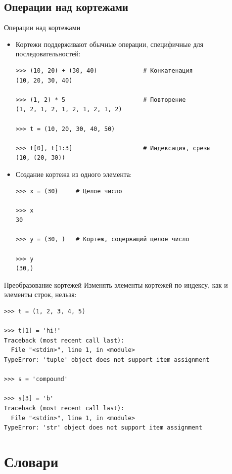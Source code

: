 \documentclass[aspectratio=169, mathserif]{beamer}%
\begin{document}
\subsection{Операции над кортежами}

\begin{frame}[fragile]{Операции над кортежами}
\scriptsize
\begin{itemize}
\item Кортежи поддерживают обычные операции, специфичные для последовательностей:
\begin{verbatim}
>>> (10, 20) + (30, 40)             # Конкатенация
(10, 20, 30, 40)

>>> (1, 2) * 5                      # Повторение
(1, 2, 1, 2, 1, 2, 1, 2, 1, 2)  

>>> t = (10, 20, 30, 40, 50)

>>> t[0], t[1:3]                    # Индексация, срезы
(10, (20, 30))
\end{verbatim}
\item Создание кортежа из одного элемента:
\begin{verbatim}
>>> x = (30)     # Целое число

>>> x
30

>>> y = (30, )   # Кортеж, содержащий целое число

>>> y
(30,)
\end{verbatim}
\end{itemize}
\vfill
\end{frame}


\begin{frame}[fragile]{Преобразование кортежей}
\scriptsize
Изменять элементы кортежей по индексу, как и элементы строк, нельзя:

\begin{verbatim}
>>> t = (1, 2, 3, 4, 5)

>>> t[1] = 'hi!'     
Traceback (most recent call last):
  File "<stdin>", line 1, in <module>
TypeError: 'tuple' object does not support item assignment

>>> s = 'compound'

>>> s[3] = 'b'
Traceback (most recent call last):
  File "<stdin>", line 1, in <module>
TypeError: 'str' object does not support item assignment
\end{verbatim}
\vfill
\end{frame}


\section{Словари}
\sectionframe
\end{document}
